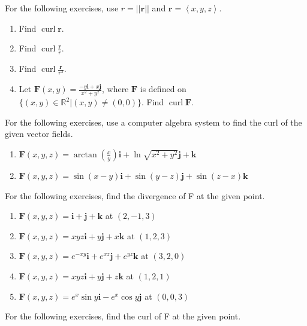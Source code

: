 \documentclass{exercises}
\begin{document}
For the following exercises, use $r=||\mathbf{r}||$ and $\mathbf{r}=\left\langle x,y,z \right\rangle$.

\begin{enumerate}[resume]
\item Find $\operatorname{curl}\mathbf{r}$.
\item Find $\operatorname{curl}\frac{\mathbf{r}}{r}$.
\item Find $\operatorname{curl}\frac{\mathbf{r}}{r^{3}}$.
\item Let $\mathbf{F}(x,y)=\frac{-y\mathbf{i}+x\mathbf{j}}{x^{2}+y^{2}}$, where $\mathbf{F}$ is defined on $\{(x,y)\in \mathbb{R}^{2}|(x,y)\ne(0,0)\}$. Find $\operatorname{curl}\mathbf{F}$.
\end{enumerate}

For the following exercises, use a computer algebra system to find the curl of the given vector fields.

\begin{enumerate}[resume]
\item \techrequired $\mathbf{F}(x,y,z)=\arctan(\frac{x}{y})\mathbf{i}+\ln \sqrt{x^{2}+y^{2}}\mathbf{j}+\mathbf{k}$
\item \techrequired $\mathbf{F}(x,y,z)=\sin(x-y)\mathbf{i}+\sin(y-z)\mathbf{j}+\sin(z-x)\mathbf{k}$
\end{enumerate}

For the following exercises, find the divergence of F at the given point.

\begin{enumerate}[resume]
\item $\mathbf{F}(x,y,z)=\mathbf{i}+\mathbf{j}+\mathbf{k}$ at $(2,-1,3)$
\item $\mathbf{F}(x,y,z)=xyz\mathbf{i}+y\mathbf{j}+x\mathbf{k}$ at $(1,2,3)$
\item $\mathbf{F}(x,y,z)=e^{-xy}\mathbf{i}+e^{xz}\mathbf{j}+e^{yz}\mathbf{k}$ at $(3,2,0)$
\item $\mathbf{F}(x,y,z)=xyz\mathbf{i}+y\mathbf{j}+z\mathbf{k}$ at $(1,2,1)$
\item $\mathbf{F}(x,y,z)=e^{x}\sin y\mathbf{i}-e^{x}\cos y\mathbf{j}$ at $(0,0,3)$
\end{enumerate}

For the following exercises, find the curl of F at the given point.
\end{document}
